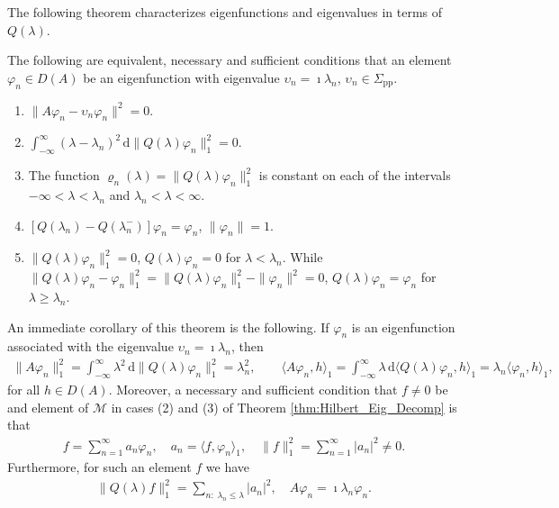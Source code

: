 \documentclass[leqno,onefignum,onetabnum]{siamltex1213}
\renewcommand{\d}{\mathrm{d}}
\newcommand{\Sigp}{\Sigma_{\text{pp}}}
\newcommand{\Mc}{\mathcal{M}}
\begin{document}
The following theorem characterizes eigenfunctions and eigenvalues in
terms of $Q(\lambda)$.
%
\begin{theorem}\label{thm:Eig_fun_val}
The following are equivalent, necessary and sufficient conditions that
an element $\varphi_n\in D(A)$ be an eigenfunction with eigenvalue $\upsilon_n=\imath\lambda_n$,
$\upsilon_n\in\Sigp$. 
%
\begin{enumerate}
\item $\|A\varphi_n-\upsilon_n\varphi_n\|^2=0$.
\item $\int_{-\infty}^\infty(\lambda-\lambda_n)^2\,\d\|Q(\lambda)\varphi_n\|_1^2=0$.
\item The function $\varrho_n(\lambda)=\|Q(\lambda)\varphi_n\|_1^2$ is constant on each of the
  intervals $-\infty<\lambda<\lambda_n$ and $\lambda_n<\lambda<\infty$.
\item $[Q(\lambda_n)-Q(\lambda_n^-)]\varphi_n=\varphi_n$, $\|\varphi_n\|=1$.
\item $\|Q(\lambda)\varphi_n\|_1^2=0$, $Q(\lambda)\varphi_n=0$ for $\lambda<\lambda_n$. While
      $\|Q(\lambda)\varphi_n-\varphi_n\|_1^2=\|Q(\lambda)\varphi_n\|_1^2-\|\varphi_n\|^2=0$, $Q(\lambda)\varphi_n=\varphi_n$ for $\lambda\geq\lambda_n$. 
\end{enumerate}
%
\end{theorem}
%
\noindent
An immediate corollary of this theorem is the following. If $\varphi_n$ is
an eigenfunction associated with the eigenvalue $\upsilon_n=\imath\lambda_n$, then
\cite{Stone:64}   
%
\begin{align}
  \|A\varphi_n\|_1^2=\int_{-\infty}^\infty\lambda^2\,\d\|Q(\lambda)\varphi_n\|_1^2=\lambda_n^2, \qquad
  \langle A\varphi_n,h\rangle_1=\int_{-\infty}^\infty\lambda\,\d\langle Q(\lambda)\varphi_n,h\rangle_1=\lambda_n\langle\varphi_n,h\rangle_1,
\end{align}
%
for all $h\in D(A)$. Moreover, a necessary and sufficient condition that
$f\neq0$ be and element of $\Mc$ in cases (2) and (3) of Theorem
\ref{thm:Hilbert_Eig_Decomp} is that
%
\begin{align}\label{eq:Eig_Fun_Expansion}
  f=\sum_{n=1}^\infty a_n\varphi_n, \quad
  a_n=\langle f,\varphi_n\rangle_1, \quad
  \|f\|_1^2=\sum_{n=1}^\infty|a_n|^2\neq0.
\end{align}
%
Furthermore, for such an element $f$ we have
%
\begin{align}
  \|Q(\lambda)f\|_1^2=\sum_{n:\;\lambda_n\leq\lambda}|a_n|^2, \quad
  A\varphi_n=\imath\lambda_n\varphi_n.
\end{align}
%
\end{document}
